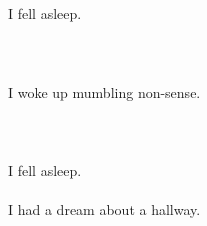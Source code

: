 \documentclass{article}
\begin{document}
    \section{}
    I fell asleep.\\\\ 
    \newpage
    
    \section{}
    I woke up mumbling non-sense.\\\\ 
    \newpage
    
    \section{}
    I fell asleep.\\\\I had a dream about a hallway.\\\\ 
    \newpage
    
    
\end{document}
